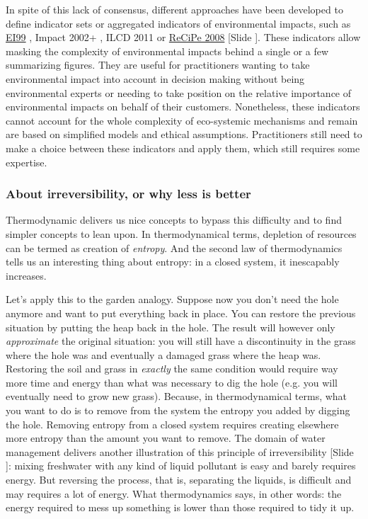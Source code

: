 \documentclass{article}
\newcounter{slide}
\begin{document}
In spite of this lack of consensus, different approaches have been developed to define indicator sets or aggregated indicators of environmental impacts, such as \href{https://www.pre-sustainability.com/download/EI99_Manual.pdf}{EI99} \cite{consultants2000eco}, Impact 2002+ \cite{jollietIMPACT2002New2003}, ILCD 2011 or \href{https://www.leidenuniv.nl/cml/ssp/publications/recipe_characterisation.pdf}{ReCiPe 2008} \cite{goedkoop2009recipe} {\color{blue}[Slide ]}. These indicators allow masking the complexity of environmental impacts behind a single or a few summarizing figures. They are useful for practitioners wanting to take environmental impact into account in decision making without being environmental experts or needing to take position on the relative importance of environmental impacts on behalf of their customers. Nonetheless, these indicators cannot account for the whole complexity of eco-systemic mechanisms and remain are based on simplified models and ethical assumptions. Practitioners still need to make a choice between these indicators and apply them, which still requires some expertise.

\subsubsection{About irreversibility, or why less is better}
\label{sec:irreversibility}
Thermodynamic delivers us nice concepts to bypass this difficulty and to find simpler concepts to lean upon. In thermodynamical terms, depletion of resources can be termed as creation of \emph{entropy}. And the second law of thermodynamics tells us an interesting thing about entropy: in a closed system, it inescapably increases.

Let's apply this to the garden analogy. Suppose now you don't need the hole anymore and want to put everything back in place. You can restore the previous situation by putting the heap back in the hole. The result will however only \emph{approximate} the original situation: you will still have a discontinuity in the grass where the hole was and eventually a damaged grass where the heap was. Restoring the soil and grass in \emph{exactly} the same condition would require way more time and energy than what was necessary to dig the hole (e.g. you will eventually need to grow new grass). Because, in thermodynamical terms, what you want to do is to remove from the system the entropy you added by digging the hole. Removing entropy from a closed system requires creating elsewhere more entropy than the amount you want to remove. The domain of water management delivers another illustration of this principle of irreversibility {\color{blue}[Slide ]}: mixing freshwater with any kind of liquid pollutant is easy and barely requires energy. But reversing the process, that is, separating the liquids, is difficult and may requires a lot of energy. What thermodynamics says, in other words: the energy required to mess up something is lower than those required to tidy it up.
\end{document}
